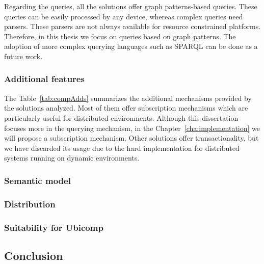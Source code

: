 Regarding the queries, all the solutions offer graph patterns-based queries.
These queries can be easily processed by any device, whereas complex queries need parsers.
These parsers are not always available for resource constrained platforms.
Therefore, in this thesis we focus on queries based on graph patterns.
The adoption of more complex querying languages such as SPARQL can be done as a future work. %






\subsubsection{Additional features}

The Table~\ref{tab:compAdds} summarizes the additional mechanisms provided by the solutions analyzed.
Most of them offer subscription mechanisms which are particularly useful for distributed environments.
Although this dissertation focuses more in the querying mechanism, in the Chapter~\ref{cha:implementation} we will propose a subscription mechanism.
Other solutions offer transactionality, but we have discarded its usage due to the hard implementation for distributed systems running on dynamic environments.






\subsubsection{Semantic model}



\subsubsection{Distribution}

\subsubsection{Suitability for Ubicomp}



\subsection{Conclusion}


